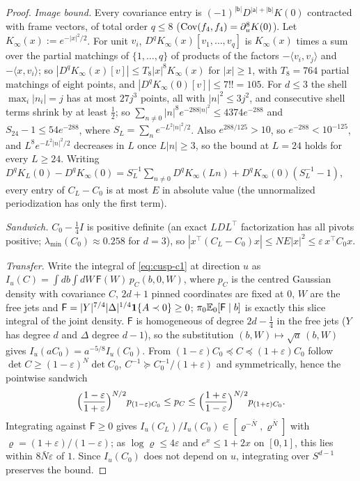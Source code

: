 \begin{proof}
\emph{Image bound.} Every covariance entry is $(-1)^{|\mathsf b|}D^{|\mathsf a|+|\mathsf b|}K(0)$ contracted with frame vectors, of total order $q\le8$ ($\operatorname{Cov}(f_4,f_4)=\partial_u^8K(0)$). Let $K_\infty(x):=e^{-|x|^2/2}$. For unit $v_i$, $D^qK_\infty(x)[v_1,\dots,v_q]$ is $K_\infty(x)$ times a sum over the partial matchings of $\{1,\dots,q\}$ of products of the factors $-\langle v_i,v_j\rangle$ and $-\langle x,v_i\rangle$; so $|D^qK_\infty(x)[v]|\le T_8|x|^8K_\infty(x)$ for $|x|\ge1$, with $T_8=764$ partial matchings of eight points, and $|D^qK_\infty(0)[v]|\le7!!=105$. For $d\le3$ the shell $\max_i|n_i|=j$ has at most $27j^3$ points, all with $|n|^2\le3j^2$, and consecutive shell terms shrink by at least $\frac12$; so $\sum_{n\ne0}|n|^8e^{-288|n|^2}\le4374e^{-288}$ and $S_{24}-1\le54e^{-288}$, where $S_L=\sum_ne^{-L^2|n|^2/2}$. Also $e^{288/125}>10$, so $e^{-288}<10^{-125}$, and $L^8e^{-L^2|n|^2/2}$ decreases in $L$ once $L|n|\ge3$, so the bound at $L=24$ holds for every $L\ge24$. Writing $D^qK_L(0)-D^qK_\infty(0)=S_L^{-1}\sum_{n\ne0}D^qK_\infty(Ln)+D^qK_\infty(0)(S_L^{-1}-1)$, every entry of $C_L-C_0$ is at most $E$ in absolute value (the unnormalized periodization has only the first term).

\emph{Sandwich.} $C_0-\frac14I$ is positive definite (an exact $LDL^{\top}$ factorization has all pivots positive; $\lambda_{\min}(C_0)\approx0.258$ for $d=3$), so $|x^{\top}(C_L-C_0)x|\le NE|x|^2\le\varepsilon\,x^{\top}C_0x$.

\emph{Transfer.} Write the integral of \eqref{eq:cusp-c1} at direction $u$ as $I_u(C)=\int db\int dW\,\mathsf F(W)\,p_C(b,0,W)$, where $p_C$ is the centred Gaussian density with covariance $C$, $2d+1$ pinned coordinates are fixed at $0$, $W$ are the free jets and $\mathsf F=|Y|^{7/4}|\Delta|^{1/4}\mathbf 1\{A\prec0\}\ge0$; $\pi_0\mathbb E_0[\mathsf F\mid b]$ is exactly this slice integral of the joint density. $\mathsf F$ is homogeneous of degree $2d-\frac14$ in the free jets ($Y$ has degree $d$ and $\Delta$ degree $d-1$), so the substitution $(b,W)\mapsto\sqrt a\,(b,W)$ gives $I_u(aC_0)=a^{-5/8}I_u(C_0)$. From $(1-\varepsilon)C_0\preceq C\preceq(1+\varepsilon)C_0$ follow $\det C\ge(1-\varepsilon)^N\det C_0$, $C^{-1}\succeq C_0^{-1}/(1+\varepsilon)$ and symmetrically, hence the pointwise sandwich
\[
\Bigl(\frac{1-\varepsilon}{1+\varepsilon}\Bigr)^{N/2}p_{(1-\varepsilon)C_0}\le p_C\le\Bigl(\frac{1+\varepsilon}{1-\varepsilon}\Bigr)^{N/2}p_{(1+\varepsilon)C_0}.
\]
Integrating against $\mathsf F\ge0$ gives $I_u(C_L)/I_u(C_0)\in[\varrho^{-\bar N},\varrho^{\bar N}]$ with $\varrho=(1+\varepsilon)/(1-\varepsilon)$; as $\log\varrho\le4\varepsilon$ and $e^x\le1+2x$ on $[0,1]$, this lies within $8\bar N\varepsilon$ of $1$. Since $I_u(C_0)$ does not depend on $u$, integrating over $S^{d-1}$ preserves the bound.
\end{proof}

